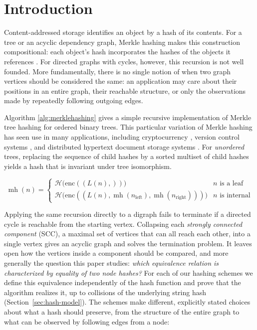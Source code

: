 \documentclass[twoside,leqno]{article}
\newcommand{\enc}{\mathrm{enc}}
\begin{document}
\section{Introduction}\label{sec:introduction}

Content-addressed storage identifies an object by a hash of its contents. For a tree or an acyclic dependency graph, Merkle hashing makes this construction compositional: each object's hash incorporates the hashes of the objects it references \cite{merkle1987digital,git,ipfs}. For directed graphs with cycles, however, this recursion is not well founded. More fundamentally, there is no single notion of when two graph vertices should be considered the same: an application may care about their positions in an entire graph, their reachable structure, or only the observations made by repeatedly following outgoing edges.

Algorithm \ref{alg:merklehashing} gives a simple recursive implementation of Merkle tree hashing for ordered binary trees. This particular variation of Merkle hashing has seen use in many applications, including cryptocurrency \cite{bitcoin}, version control systems \cite{git}, and distributed hypertext document storage systems \cite{ipfs}. For \emph{unordered} trees, replacing the sequence of child hashes by a sorted multiset of child hashes yields a hash that is invariant under tree isomorphism.

\begin{algorithm}
\caption{Recursive Merkle Hashing of a Full Ordered Binary Tree}
\label{alg:merklehashing}
\[
\operatorname{mh}(n) =
\begin{cases}
    \mathcal{H}\bigl(\enc((L(n),))\bigr) & n \text{ is a leaf} \\
    \mathcal{H}\bigl(\enc((L(n),\operatorname{mh}(n_{\mathrm{left}}),\operatorname{mh}(n_{\mathrm{right}})))\bigr)
    & n \text{ is internal}
\end{cases}
\]
\end{algorithm}

Applying the same recursion directly to a digraph fails to terminate if a directed cycle is reachable from the starting vertex. Collapsing each \emph{strongly connected component} (SCC), a maximal set of vertices that can all reach each other, into a single vertex gives an acyclic graph and solves the termination problem. It leaves open how the vertices inside a component should be compared, and more generally the question this paper studies: \emph{which equivalence relation is characterized by equality of two node hashes?} For each of our hashing schemes we define this equivalence independently of the hash function and prove that the algorithm realizes it, up to collisions of the underlying string hash (Section~\ref{sec:hash-model}). The schemes make different, explicitly stated choices about what a hash should preserve, from the structure of the entire graph to what can be observed by following edges from a node:
\end{document}
